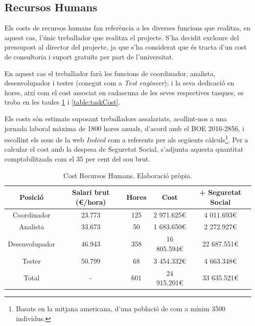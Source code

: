 \documentclass[a4paper]{report}
\begin{document}
	\subsection{Recursos Humans}
	Els costs de recursos humans fan referència a les diverses funcions que realitza, en aquest cas, l'únic treballador que realitza el projecte. S'ha decidit excloure del pressupost al director del projecte, ja que s'ha considerat que és tracta d'un cost de consultoria i suport gratuïts per part de l'universitat.
	\par 
	En aquest cas el treballador farà les funcions de coordinador, analista, desenvolupador i tester (conegut com a \textit{Test engineer}); i la seva dedicació en hores, així com el cost associat  en cadascuna de les seves respectives tasques, es troba en les taules \ref{table:humansCost} i \ref{table:taskCost}. \par
	Els costs són estimats suposant treballadors assalariats, acollint-nos a una jornada laboral màxima de 1800 hores anuals, d'acord amb el BOE 2016-2856\cite{boe}, i escollint els sous de la web \textit{Indeed}\cite{indeed} com a referents per als següents càlculs\footnote{Basats en la mitjana americana, d'una població de com a mínim 3500 individus.}. Per a calcular el cost amb la despesa de Seguretat Social, s'adjunta aquesta quantitat comptabilitzada com el 35 per cent del sou brut.
	\begin{table}
		\centering
		\hspace*{-1cm}
		\begin{tabular}{|| c || c | c | c | c ||}
			\hline
			\textbf{Posició} & \textbf{Salari brut (\euro/hora)} & \textbf{Hores} & \textbf{Cost} & \textbf{+ Seguretat Social}\\
			\hline \hline
			Coordinador	& 23.773	& 125	& 2 971.625\euro	& 4 011.693\euro \\
			Analista	& 33.673	& 50	& 1 683.650\euro	& 2 272.927\euro \\
			Desenvolupador &	46.943 & 358	& 16 805.594\euro	& 22 687.551\euro \\
			Tester 		&	50.799 & 68 & 3 454.332\euro	& 4 663.348\euro \\			
			\hline \hline 
			Total & - & 601 & 24 915.201\euro & 33 635.521\euro \\ 
			\hline
		\end{tabular}
		\caption[Cost RRHH]{Cost Recursos Humans. Elaboració pròpia.}
		\label{table:humansCost}
	\end{table}
\end{document}
